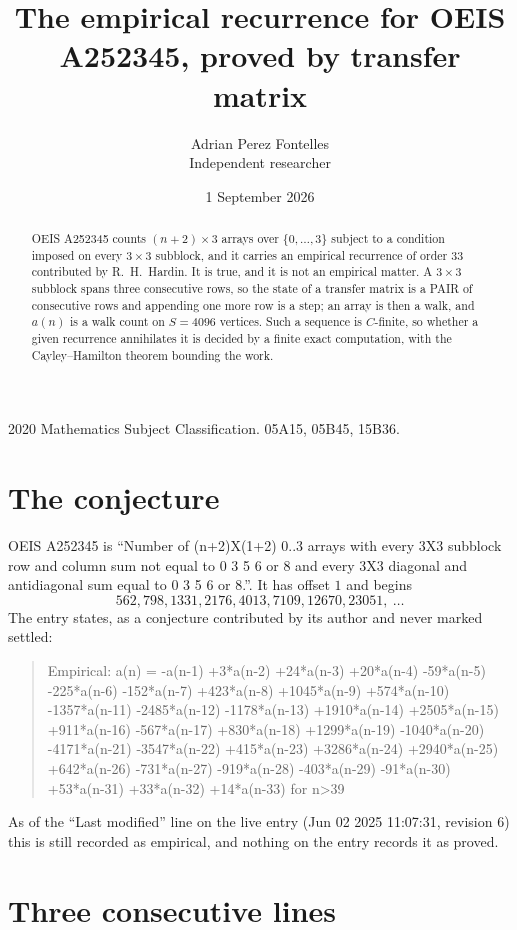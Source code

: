 \documentclass[11pt,a4paper]{article}
\title{The empirical recurrence for OEIS A252345, proved by transfer matrix}
\author{Adrian Perez Fontelles\\ \small Independent researcher}
\date{1 September 2026}
\theoremstyle{plain}
\theoremstyle{definition}
\begin{document}
\maketitle

\begin{abstract}
OEIS A252345 counts $(n+2)\times3$ arrays over $\{0,\dots,3\}$ subject to a condition imposed on
every $3\times3$ subblock, and it carries an empirical recurrence of order $33$
contributed by R.~H.~Hardin. It is true, and it is not an empirical matter. A $3\times3$
subblock spans three consecutive rows, so the state of a transfer matrix is a PAIR of
consecutive rows and appending one more row is a step; an array is then a walk, and
$a(n)$ is a walk count on $S=4096$ vertices. Such a sequence is $C$-finite, so whether a given
recurrence annihilates it is decided by a finite exact computation, with the Cayley--Hamilton
theorem bounding the work.
\end{abstract}

\noindent\small 2020 Mathematics Subject Classification. 05A15, 05B45, 15B36.\normalsize

\section{The conjecture}

OEIS A252345 is ``Number of (n+2)X(1+2) 0..3 arrays with every 3X3 subblock row and column sum not equal to 0 3 5 6 or 8 and every 3X3 diagonal and antidiagonal sum equal to 0 3 5 6 or 8.''. It has offset $1$ and begins
\[
562, 798, 1331, 2176, 4013, 7109, 12670, 23051,\ \dots
\]
The entry states, as a conjecture contributed by its author and never marked settled:
\begin{quote}
Empirical: a(n) = -a(n-1) +3*a(n-2) +24*a(n-3) +20*a(n-4) -59*a(n-5) -225*a(n-6) -152*a(n-7) +423*a(n-8) +1045*a(n-9) +574*a(n-10) -1357*a(n-11) -2485*a(n-12) -1178*a(n-13) +1910*a(n-14) +2505*a(n-15) +911*a(n-16) -567*a(n-17) +830*a(n-18) +1299*a(n-19) -1040*a(n-20) -4171*a(n-21) -3547*a(n-22) +415*a(n-23) +3286*a(n-24) +2940*a(n-25) +642*a(n-26) -731*a(n-27) -919*a(n-28) -403*a(n-29) -91*a(n-30) +53*a(n-31) +33*a(n-32) +14*a(n-33) for n>39
\end{quote}
As of the ``Last modified'' line on the live entry (Jun 02 2025 11:07:31, revision 6) this is still
recorded as empirical, and nothing on the entry records it as proved.

\section{Three consecutive lines}
\end{document}
